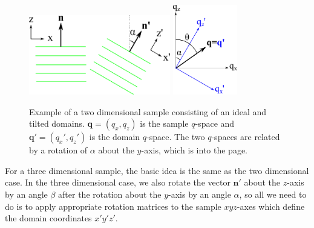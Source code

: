 \begin{figure}
  \centering
  \includegraphics[width=0.55\textwidth]{figures/ripple/mosaic/mosaic_2D}
  \quad\quad
  \includegraphics[width=0.25\textwidth]{figures/ripple/mosaic/mosaic_2Dqspace}
  \caption{Example of a two dimensional sample consisting of an ideal
  and tilted domains. $\mathbf{q} = (q_x,q_z)$ is the sample $q$-space and
  $\mathbf{q'} = (q_x',q_z')$ is the domain $q$-space. The two $q$-spaces
  are related by a rotation of $\alpha$ about the $y$-axis, which is into 
  the page.}
  \label{fig:mosaic_2D}
\end{figure}

For a three dimensional sample, the basic idea is the same as the two 
dimensional case. In the three dimensional case, we also rotate the vector $\mathbf{n'}$
about the $z$-axis by an angle $\beta$ after the rotation about the $y$-axis
by an angle $\alpha$, so
all we need to do is to apply appropriate rotation matrices to
the sample $xyz$-axes which define the domain coordinates $x'y'z'$.

